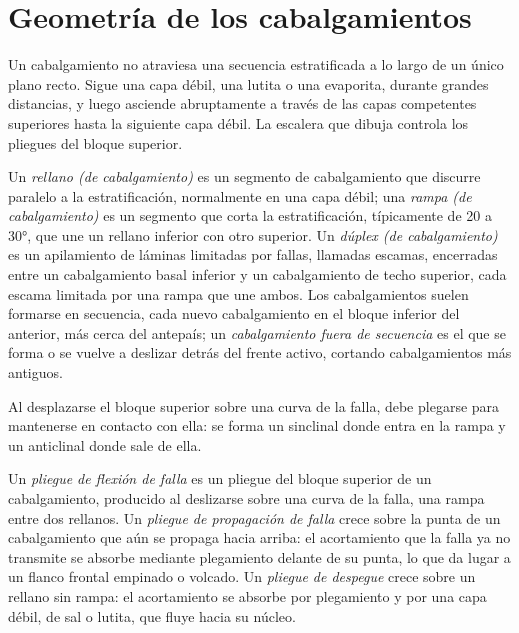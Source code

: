 \section{Geometría de los cabalgamientos}\label{sec:b3:orogenic-wedges:geometry}

Un cabalgamiento no atraviesa una secuencia estratificada a lo largo de un único plano recto.
Sigue una capa débil, una lutita o una evaporita, durante grandes distancias, y luego
asciende abruptamente a través de las capas competentes superiores hasta la siguiente capa débil. La
escalera que dibuja controla los pliegues del bloque superior.

\begin{definition}\label{def:b3:orogenic-wedges:thrust-geometry}
Un \emph{rellano (de cabalgamiento)} es un segmento de cabalgamiento que discurre
paralelo a la estratificación, normalmente en una capa débil; una \emph{rampa
(de cabalgamiento)} es un segmento que corta la estratificación,
típicamente de 20 a \ang{30}, que une un rellano inferior con otro superior. Un
\emph{dúplex (de cabalgamiento)} es un apilamiento de láminas limitadas por fallas,
llamadas escamas, encerradas entre un cabalgamiento basal inferior y un cabalgamiento de techo
superior, cada escama limitada por una rampa que une ambos. Los cabalgamientos suelen formarse
en secuencia, cada nuevo cabalgamiento en el bloque inferior del anterior, más cerca del
antepaís; un \emph{cabalgamiento fuera de secuencia} es
el que se forma o se vuelve a deslizar detrás del frente activo, cortando cabalgamientos más antiguos.
\end{definition}

Al desplazarse el bloque superior sobre una curva de la falla, debe plegarse para mantenerse en
contacto con ella: se forma un sinclinal donde entra en la rampa y un anticlinal
donde sale de ella.

\begin{definition}\label{def:b3:orogenic-wedges:thrust-folds}
Un \emph{pliegue de flexión de falla} es un pliegue del bloque superior
de un cabalgamiento, producido al deslizarse sobre una curva de la falla, una rampa entre
dos rellanos. Un \emph{pliegue de propagación de falla}
crece sobre la punta de un cabalgamiento que aún se propaga hacia arriba: el
acortamiento que la falla ya no transmite se absorbe mediante plegamiento delante de
su punta, lo que da lugar a un flanco frontal empinado o volcado. Un \emph{pliegue de
despegue} crece sobre un rellano sin rampa: el acortamiento
se absorbe por plegamiento y por una capa débil, de sal o lutita, que fluye hacia
su núcleo.
\end{definition}

